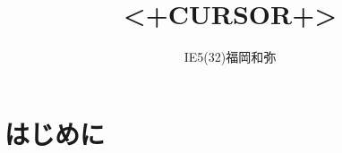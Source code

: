 \documentclass[10pt,a4paper,dvipdfmx]{jarticle}
\title{<+CURSOR+>}
\author{IE5(32)福岡和弥}
\begin{document}
\maketitle

\section{はじめに}





\end{document}
